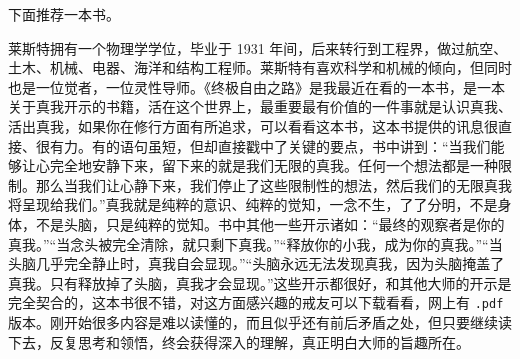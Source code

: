 下面推荐一本书。

\begin{book}
    莱斯特拥有一个物理学学位，毕业于 1931 年间，后来转行到工程界，做过航空、土木、机械、电器、海洋和结构工程师。莱斯特有喜欢科学和机械的倾向，但同时也是一位觉者，一位灵性导师。《终极自由之路》是我最近在看的一本书，是一本关于真我开示的书籍，活在这个世界上，最重要最有价值的一件事就是认识真我、活出真我，如果你在修行方面有所追求，可以看看这本书，这本书提供的讯息很直接、很有力。有的语句虽短，但却直接戳中了关键的要点，书中讲到：“当我们能够让心完全地安静下来，留下来的就是我们无限的真我。任何一个想法都是一种限制。那么当我们让心静下来，我们停止了这些限制性的想法，然后我们的无限真我将呈现给我们。”真我就是纯粹的意识、纯粹的觉知，一念不生，了了分明，不是身体，不是头脑，只是纯粹的觉知。书中其他一些开示诸如：“最终的观察者是你的真我。”“当念头被完全清除，就只剩下真我。”“释放你的小我，成为你的真我。”“当头脑几乎完全静止时，真我自会显现。”“头脑永远无法发现真我，因为头脑掩盖了真我。只有释放掉了头脑，真我才会显现。”这些开示都很好，和其他大师的开示是完全契合的，这本书很不错，对这方面感兴趣的戒友可以下载看看，网上有 \texttt{.pdf} 版本。刚开始很多内容是难以读懂的，而且似乎还有前后矛盾之处，但只要继续读下去，反复思考和领悟，终会获得深入的理解，真正明白大师的旨趣所在。
\end{book}

